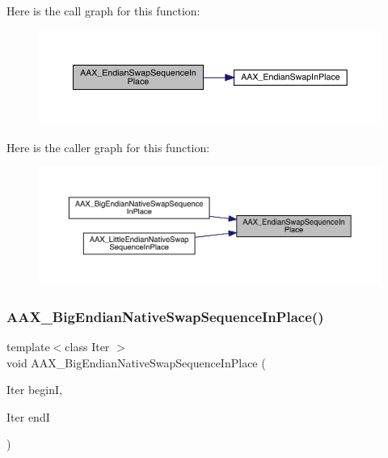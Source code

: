 Here is the call graph for this function\+:
\nopagebreak
\begin{figure}[H]
\begin{center}
\leavevmode
\includegraphics[width=350pt]{a00488_ae58f8ce3c8247e07d49e17c011ec5366_cgraph}
\end{center}
\end{figure}
Here is the caller graph for this function\+:
\nopagebreak
\begin{figure}[H]
\begin{center}
\leavevmode
\includegraphics[width=350pt]{a00488_ae58f8ce3c8247e07d49e17c011ec5366_icgraph}
\end{center}
\end{figure}
\mbox{\label{a00488_ae9e72785a26249cd3e3c05baf8c9ce70}} 
\subsubsection{\texorpdfstring{AAX\_BigEndianNativeSwapSequenceInPlace()}{AAX\_BigEndianNativeSwapSequenceInPlace()}}
{\footnotesize\ttfamily template$<$class Iter $>$ \\
void A\+A\+X\+\_\+\+Big\+Endian\+Native\+Swap\+Sequence\+In\+Place (\begin{DoxyParamCaption}\item[{Iter}]{beginI,  }\item[{Iter}]{endI }\end{DoxyParamCaption})\hspace{0.3cm}{\ttfamily [inline]}}



